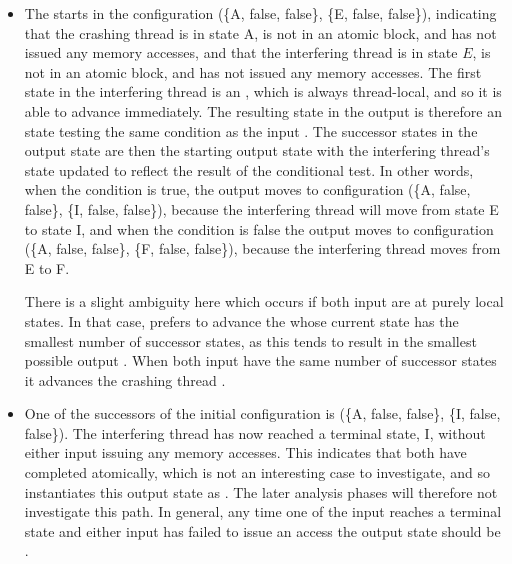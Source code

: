 \begin{itemize}
\item The {\StateMachine} starts in the configuration (\{A, false,
  false\}, \{E, false, false\}), indicating that the crashing thread
  {\StateMachine} is in state A, is not in an atomic block, and has
  not issued any memory accesses, and that the interfering thread
  {\StateMachine} is in state $E$, is not in an atomic block, and has
  not issued any memory accesses.  The first state in the interfering
  thread is an , which is always thread-local, and so it is
  able to advance immediately.  The resulting state in the output
  {\StateMachine} is therefore an  state testing the same
  condition as the input .  The successor states in the
  output state are then the starting output state with the interfering
  thread's state updated to reflect the result of the conditional test.
  In other words, when the condition is true, the output {\StateMachine}
  moves to configuration (\{A, false, false\}, \{I, false, false\}),
  because the interfering thread {\StateMachine} will move from state E
  to state I, and when the condition is false the output {\StateMachine}
  moves to configuration (\{A, false, false\}, \{F, false, false\}),
  because the interfering thread {\StateMachine} moves from E to F.

  There is a slight ambiguity here which occurs if both input
  {\StateMachines} are at purely local states.  In that case,
  {\technique} prefers to advance the {\StateMachine} whose current
  state has the smallest number of successor states, as this tends to
  result in the smallest possible output {\StateMachine}.  When both
  input {\StateMachines} have the same number of successor states it
  advances the crashing thread {\StateMachine}.

\item One of the successors of the initial configuration is (\{A,
  false, false\}, \{I, false, false\}).  The interfering thread
  {\StateMachine} has now reached a terminal state, I, without either
  input {\StateMachine} issuing any memory accesses.  This indicates
  that both {\StateMachines} have completed atomically, which is not
  an interesting case to investigate, and so {\technique} instantiates
  this output state as .  The later analysis phases
  will therefore not investigate this path.  In general, any time one
  of the input {\StateMachines} reaches a terminal state and either
  input {\StateMachine} has failed to issue an access the output state
  should be .


\end{itemize}
